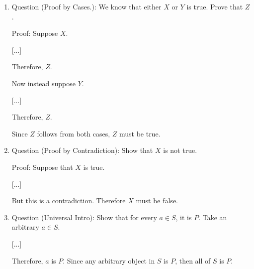 \documentclass[../../../include/open-logic-section]{subfiles}
\begin{document}
\begin{enumerate}
\item Question (Proof by Cases.): We know that either $X$ or $Y$ is true.
Prove that $Z$.

Proof: Suppose $X$.

[...]

Therefore, $Z$.

Now instead suppose $Y$.

[...]

Therefore, $Z$.

Since $Z$ follows from both cases, $Z$ must be true.

\item Question (Proof by Contradiction): Show that $X$ is not true.

Proof: Suppose that $X$ is true.

[...]

But this is a contradiction. Therefore $X$ must be false.

\item Question (Universal Intro): Show that for every $a \in S$, it is $P$.
Take an arbitrary $a \in S$.

[...]

Therefore, $a$ is $P$. Since any arbitrary object in $S$ is $P$, then all
of $S$ is $P$.

\end{enumerate}
\end{document}
